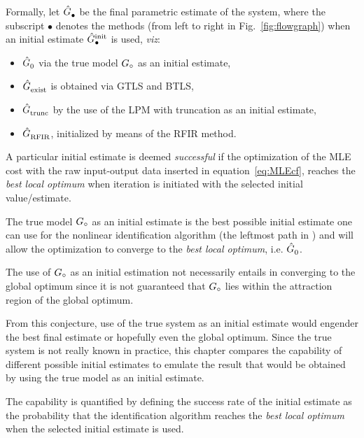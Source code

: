 Formally, let $\model{\bullet}$ be the final parametric estimate of the system, where the subscript $\bullet$ denotes the methods (from left to right in Fig.~\ref{fig:flowgraph}) when an initial estimate $\model[init]{\bullet}$ is used, \emph{viz}:
\begin{itemize}
\item 
$\model{0}$ via the true model $\true{G}$ as an initial estimate,
\item
$\model{exist}$ is obtained via GTLS and BTLS,
\item
$\model{trunc}$ by the use of the LPM with truncation as an initial estimate,
\item
$\model{RFIR}$, initialized by means of the RFIR method. 
\end{itemize} 

A particular initial estimate is deemed \emph{successful} if the optimization of the MLE cost with the raw input-output data inserted in equation~\eqref{eq:MLEcf}, reaches the \emph{best local optimum} when iteration is initiated with the selected initial value/estimate.

\begin{conjecture}\label{conj1}
The true model $\true{G}$ as an initial estimate is the best possible initial estimate one can use for the nonlinear identification algorithm (the leftmost path in ) and will allow the optimization to converge to the \emph{best local optimum}, i.e. $\model{0}$.
\end{conjecture}
\begin{remark}
The use of $\true{G}$ as an initial estimation not necessarily entails in converging to the global optimum since it is not guaranteed that $\true{G}$ lies within the attraction region of the global optimum.
\end{remark}

From this conjecture, use of the true system as an initial estimate would engender the best final estimate or hopefully even the global optimum.
Since the true system is not really known in practice, this chapter compares the capability of different possible initial estimates to emulate the result that would be obtained by using the true model as an initial estimate. 

The capability is quantified by defining the success rate of the initial estimate as the probability that the identification algorithm reaches the \emph{best local optimum} when the selected initial estimate is used. %


